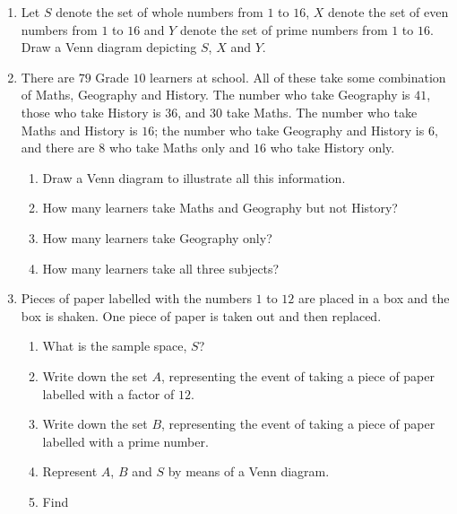 \begin{exercises}{}{
    \begin{enumerate}[itemsep=5pt, label=\textbf{\arabic*}. ]
    \item Let $S$ denote the set of whole numbers from $1$ to $16$, $X$
      denote the set of even numbers from $1$ to $16$ and $Y$ denote the
      set of prime numbers from $1$ to $16$. Draw a Venn diagram depicting $S$, $X$ and $Y$.
    \item
      There are $79$ Grade $10$ learners at school. All of these
      take some combination of Maths, Geography and History. The number who take
      Geography is $41$, those who take History is $36$, and $30$ take
      Maths. The number who take Maths and History is $16$; the number
      who take Geography and History is $6$, and there are $8$ who take
      Maths only and $16$ who take History only.
      \begin{enumerate}[noitemsep, label=\textbf{(\alph*)} ]
      \item Draw a Venn diagram to illustrate all this information.
      \item How many learners take Maths and Geography but not History?
      \item How many learners take Geography only?
      \item How many learners take all three subjects?
      \end{enumerate}
    \item Pieces of paper labelled with the numbers $1$ to $12$ are
      placed in a box and the box is shaken. One piece of paper is taken
      out and then replaced.
      \begin{enumerate}[noitemsep, label=\textbf{(\alph*)} ]
      \item What is the sample space, $S$?
      \item Write down the set $A$, representing the event of taking a
        piece of paper labelled with a factor of $12$.
      \item Write down the set $B$, representing the event of taking a
        piece of paper labelled with a prime number.
      \item Represent $A$, $B$ and $S$ by means of a Venn diagram.
      \item Find
        \begin{enumerate}[noitemsep, label=\textbf{\roman*.} ]

\end{enumerate}
\end{enumerate}
\end{enumerate}}
\end{exercises}
